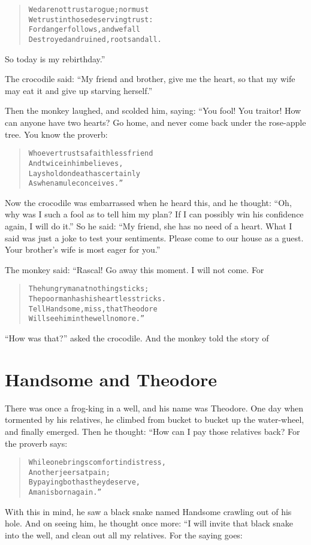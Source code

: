 \documentclass[article, twoside, 14pt]{memoir}
\renewenvironment{verbatim}{%
\begin{quote}%
\vskip -10pt%
\begin{alltt}\normalfont\large}{\end{alltt}%
\end{quote}%
\vskip -10pt
} %
\begin{document}
\begin{verbatim}
We dare not trust a rogue; nor must
We trust in those deserving trust:
For danger follows, and we fall
Destroyed and ruined, roots and all.
\end{verbatim}
So today is my rebirthday.”

The crocodile said:
``My friend and brother, give me the heart, so that my wife may eat it and give up starving herself.''

Then the monkey laughed, and scolded him, saying: “You fool! You
traitor! How can anyone have two hearts? Go home, and never come
back under the rose-apple tree. You know the proverb:

\begin{verbatim}
Whoever trusts a faithless friend
    And twice in him believes,
Lays hold on death as certainly
    As when a mule conceives.”
\end{verbatim}
Now the crocodile was embarrassed when he heard this, and he
thought:
``Oh, why was I such a fool as to tell him my plan? If I can possibly win his confidence again, I will do it.''
So he said:
``My friend, she has no need of a heart. What I said was just a joke to test your sentiments. Please come to our house as a guest. Your brother's wife is most eager for you.''

The monkey said: “Rascal! Go away this moment. I will not come.
For

\begin{verbatim}
The hungry man at nothing sticks;
The poor man has his heartless tricks.
Tell Handsome, miss, that Theodore
Will see him in the well no more.”
\end{verbatim}
``How was that?'' asked the crocodile. And the monkey told the
story of

\chapter{Handsome and Theodore}

\label{s67}

There was once a frog-king in a well, and his name was Theodore.
One day when tormented by his relatives, he climbed from bucket to
bucket up the water-wheel, and finally emerged. Then he thought:
“How can I pay those relatives back? For the proverb says:

\begin{verbatim}
While one brings comfort in distress,
    Another jeers at pain;
By paying both as they deserve,
    A man is born again.”
\end{verbatim}
With this in mind, he saw a black snake named Handsome crawling out
of his hole. And on seeing him, he thought once more: “I will
invite that black snake into the well, and clean out all my
relatives. For the saying goes:
\end{document}
